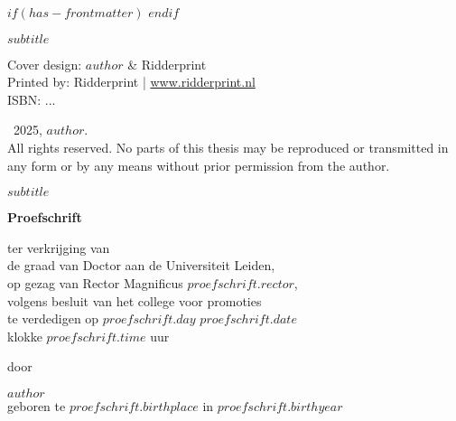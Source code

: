 $if(has-frontmatter)$
\frontmatter
$endif$


\begin{titlepage}
  \hspace{0pt}
  \vfill
  \begin{center}
     \par %
    \smallskip
    \textsf{\Large $subtitle$} \par
    \vfill
  \end{center}
\end{titlepage}


\clearpage
\thispagestyle{empty}
\vspace*{\fill} %

\begingroup
  \setlength{\parskip}{\baselineskip}
  \begin{flushleft}
    Cover design: $author$ \& Ridderprint \\
    Printed by: Ridderprint | \href{www.ridderprint.nl}{www.ridderprint.nl} \\
    ISBN: ...\par

    \textcopyright \ 2025, $author$. \\
    All rights reserved. No parts of this thesis may be reproduced or transmitted in any form or by any means without prior permission from the author.
  \end{flushleft}
\endgroup


\clearpage
\thispagestyle{empty}

\begin{center}
   \par %
  \smallskip
  \textsf{\Large $subtitle$} \par
  \vfill
  \textbf{\large Proefschrift} \par
  \vspace{2\baselineskip}
  \large{
    ter verkrijging van \\
    de graad van Doctor aan de Universiteit Leiden, \\
    op gezag van Rector Magnificus $proefschrift.rector$, \\
    volgens besluit van het college voor promoties \\
    te verdedigen op $proefschrift.day$ $proefschrift.date$ \\
    klokke $proefschrift.time$ uur
  } \par
  \vspace{2\baselineskip}
  \large{door} \par
  \vspace{2\baselineskip}
  \large{$author$} \\
  \normalsize{geboren te $proefschrift.birthplace$ in $proefschrift.birthyear$} \par
\end{center}


